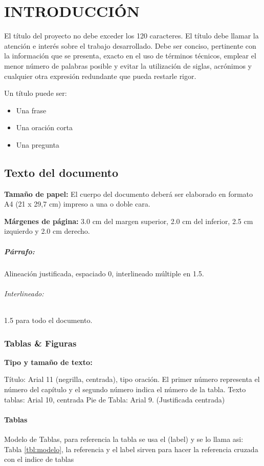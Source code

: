 \chapter{INTRODUCCI\'ON}
\thispagestyle{empty}

El título del proyecto no debe exceder los 120 caracteres.
El título debe llamar la atención e interés sobre el trabajo desarrollado. Debe ser conciso, pertinente con la información que se presenta, exacto en el uso de términos técnicos, emplear el menor número de palabras posible y evitar la utilización de siglas, acrónimos y cualquier otra expresión redundante que pueda restarle rigor. 

Un título puede ser:
\begin{itemize}
    \item Una frase
    \item Una oración corta 
    \item Una pregunta 
\end{itemize}

\section{Texto del documento}
\textbf{Tamaño de papel:} El cuerpo del documento deberá ser elaborado en formato A4 (21 x 29,7 cm) impreso a una o doble cara.

\textbf{Márgenes de página:} 3.0 cm del margen superior, 2.0 cm del inferior, 2.5 cm izquierdo y 2.0 cm derecho.

\paragraph{Párrafo:}
Alineación justificada, espaciado 0, interlineado múltiple en 1.5.

\subparagraph{Interlineado:}
1.5 para todo el documento.

\subsection{Tablas \& Figuras}
\textbf{Tipo y tamaño de texto:}

Título: Arial 11 (negrilla, centrada), tipo oración. El primer número representa el número del capítulo y el segundo número indica el número de la tabla.
Texto tablas: Arial 10, centrada
Pie de Tabla: Arial 9. (Justificada centrada) 


\subsubsection{Tablas}
Modelo de Tablas, para referencia la tabla se usa el (label) y se lo llama asi: Tabla \ref{tbl:modelo}, la referencia y el label sirven para hacer la referencia cruzada con el indice de tablas

